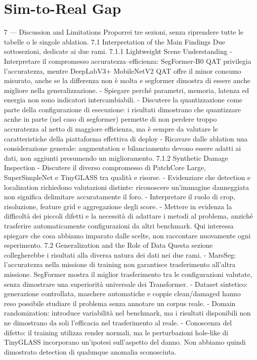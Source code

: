 \section{Sim-to-Real Gap}
7 — Discussion and Limitations
Proporrei tre sezioni, senza riprendere tutte le tabelle o le singole ablation.
7.1 Interpretation of the Main Findings
Due sottosezioni, dedicate ai due rami.
7.1.1 Lightweight Scene Understanding
- Interpretare il compromesso accuratezza–efficienza: SegFormer-B0 QAT privilegia l’accuratezza, mentre DeepLabV3+ MobileNetV2 QAT offre il minor consumo misurato, anche se la differenza non è molta e segformer dimostra di essere anche migliore nella generalizzazione.
- Spiegare perché parametri, memoria, latenza ed energia non sono indicatori intercambiabili.
- Discutere la quantizzazione come parte della configurazione di esecuzione: i risultati dimostrano che quantizzare acnhe in parte (nel caso di segformer) permette di non perdere troppo accuratezza al netto di maggiore efficienza, ma è sempre da valutare le caratteristiche della piattaforma effettiva di deploy 
- Ricavare dalle ablation una considerazione generale: augmentation e bilanciamento devono essere adatti ai dati, non aggiunti presumendo un miglioramento.
7.1.2 Synthetic Damage Inspection
- Discutere il diverso compromesso di PatchCore Large, SuperSimpleNet e TinyGLASS tra qualità e risorse.
- Evidenziare che detection e localization richiedono valutazioni distinte: riconoscere un’immagine danneggiata non significa delimitare accuratamente il foro.
- Interpretare il ruolo di crop, risoluzione, feature grid e aggregazione degli score.
- Mettere in evidenza la difficoltà dei piccoli difetti e la necessità di adattare i metodi al problema, anziché trasferire automaticamente configurazioni da altri benchmark.
Qui interessa spiegare che cosa abbiamo imparato dalle scelte, non raccontare nuovamente ogni esperimento.
7.2 Generalization and the Role of Data
Questa sezione collegherebbe i risultati alla diversa natura dei dati nei due rami.
- MarsSeg: l’accuratezza nella missione di training non garantisce trasferimento all’altra missione. SegFormer mostra il miglior trasferimento tra le configurazioni valutate, senza dimostrare una superiorità universale dei Transformer.
- Dataset sintetico: generazione controllata, maschere automatiche e coppie clean/damaged hanno reso possibile studiare il problema senza annotare un corpus reale.
- Domain randomization: introduce variabilità nel benchmark, ma i risultati disponibili non ne dimostrano da soli l’efficacia nel trasferimento al reale.
- Conoscenza del difetto: il training utilizza render normali, ma le perturbazioni hole-like di TinyGLASS incorporano un’ipotesi sull’aspetto del danno. Non abbiamo quindi dimostrato detection di qualunque anomalia sconosciuta.
